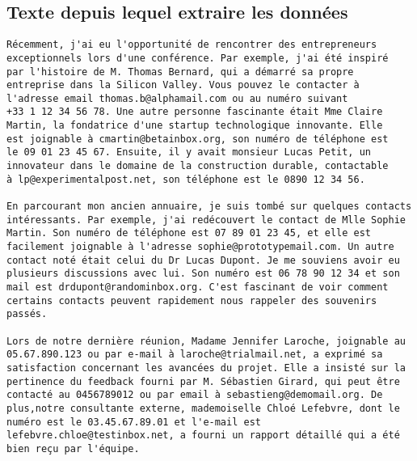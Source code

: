 \documentclass[a4paper,12pt]{article}
\begin{document}
\subsection*{Texte depuis lequel extraire les données}
\begin{verbatim}
Récemment, j'ai eu l'opportunité de rencontrer des entrepreneurs
exceptionnels lors d'une conférence. Par exemple, j'ai été inspiré 
par l'histoire de M. Thomas Bernard, qui a démarré sa propre 
entreprise dans la Silicon Valley. Vous pouvez le contacter à 
l'adresse email thomas.b@alphamail.com ou au numéro suivant 
+33 1 12 34 56 78. Une autre personne fascinante était Mme Claire 
Martin, la fondatrice d'une startup technologique innovante. Elle 
est joignable à cmartin@betainbox.org, son numéro de téléphone est
le 09 01 23 45 67. Ensuite, il y avait monsieur Lucas Petit, un
innovateur dans le domaine de la construction durable, contactable 
à lp@experimentalpost.net, son téléphone est le 0890 12 34 56.

En parcourant mon ancien annuaire, je suis tombé sur quelques contacts
intéressants. Par exemple, j'ai redécouvert le contact de Mlle Sophie
Martin. Son numéro de téléphone est 07 89 01 23 45, et elle est
facilement joignable à l'adresse sophie@prototypemail.com. Un autre
contact noté était celui du Dr Lucas Dupont. Je me souviens avoir eu
plusieurs discussions avec lui. Son numéro est 06 78 90 12 34 et son
mail est drdupont@randominbox.org. C'est fascinant de voir comment 
certains contacts peuvent rapidement nous rappeler des souvenirs 
passés.

Lors de notre dernière réunion, Madame Jennifer Laroche, joignable au
05.67.890.123 ou par e-mail à laroche@trialmail.net, a exprimé sa
satisfaction concernant les avancées du projet. Elle a insisté sur la
pertinence du feedback fourni par M. Sébastien Girard, qui peut être
contacté au 0456789012 ou par email à sebastieng@demomail.org. De 
plus,notre consultante externe, mademoiselle Chloé Lefebvre, dont le
numéro est le 03.45.67.89.01 et l'e-mail est 
lefebvre.chloe@testinbox.net, a fourni un rapport détaillé qui a été 
bien reçu par l'équipe.
\end{verbatim}
\medskip
\end{document}
